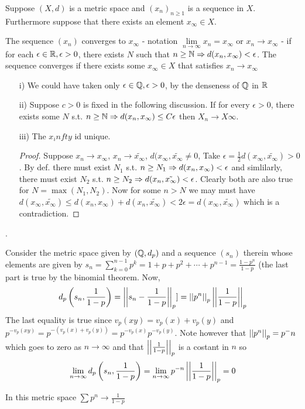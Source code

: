 Suppose $(X,d)$ is a metric space and $(x_n)_{n\geq 1}$ is a sequence in $X$. Furthermore suppose that there exists an element $x_\infty\in X$.
\begin{mydef}
The sequence $(x_n)$ converges to $x_\infty$ - notation $\lim\limits_{n\to\infty} x_n = x_\infty$ or $x_n\to x_\infty$ - if for each $\epsilon\in\mathbb{R},\epsilon>0$, there exists $N$ such that $n\geq\mathbb{N}\Rightarrow d(x_n,x_\infty)<\epsilon$. The sequence converges if there exists some $x_\infty\in X$ that satisfies $x_n\to x_\infty$
\end{mydef}
\begin{rem}
\begin{itemize}
\item[i)] We could have taken only $\epsilon\in\mathbb{Q},\epsilon>0$, by the denseness of $\mathbb{Q}$ in $\mathbb{R}$
\item[ii)] Suppose $c>0$ is fixed in the following discussion. If for every $\epsilon>0$, there exists some $N$ s.t. $n\geq\mathbb{N}\Rightarrow d(x_n,x_\infty)\leq C\epsilon$ then $X_n\to X\infty$.
\item[iii)] The $x_infty$ id unique.
\begin{proof}
Suppose $x_n\to x_\infty$, $x_n\to \tilde{x_\infty}$, $d(x_\infty,\tilde{x_\infty}\neq0$, Take $\epsilon=\frac{1}{2}d(x_\infty,\tilde{x_\infty})>0$. By def. there must exist $N_1$ s.t. $n\geq N_1\Rightarrow d(x_n,x_\infty)<\epsilon$ and simlilarly, there must exist $N_2$ s.t. $n\geq N_2\Rightarrow d(x_n,\tilde{x_\infty})<\epsilon$. Clearly both are also true for $N=\max(N_1,N_2)$. Now for some $n>N$ we may must have $d(x_\infty,\tilde{x_\infty})\leq d(x_n,x_\infty) + d(x_n,\tilde{x_\infty}) < 2\epsilon=d(x_\infty,\tilde{x_\infty})$ which is a contradiction.
\end{proof}
\end{itemize}
\end{rem}.
\begin{example}
Consider the metric space given by $(\mathbb{Q},d_p)$ and a sequence $(s_n)$ therein whose elements are given by $s_n=\sum\limits_{k=0}^{n-1} p^k=1+p+p^2+\cdots+p^{n-1}=\frac{1-p^n}{1-p}$ (the last part is true by the binomial theorem. Now,
\[ d_p\left(s_n,\dfrac{1}{1-p}\right)=\left|\left| s_n-\dfrac{1}{1-p} \right|\right|_p]=\left|\left| p^n \right|\right|_p\left|\left| \dfrac{1}{1-p} \right|\right|_p \]
The last equality is true since $v_p(xy) = v_p(x)+v_p(y)$ and $p^{-v_p(xy)}=p^{-(v_p(x)+v_p(y))}=p^{-v_p(x)}p^{-v_p(y)}$.
Note however that $\left|\left| p^n \right|\right|_p=p^-n$ which goes to zero as $n\to\infty$ and that $\left|\left| \frac{1}{1-p} \right|\right|_p$ is a costant in $n$ so
\[ \lim\limits_{n\to\infty} d_p\left(s_n,\dfrac{1}{1-p}\right) = \lim\limits_{n\to\infty} p^{-n}\left|\left| \dfrac{1}{1-p} \right|\right|_p = 0 \]
\end{example}
 In this metric space $\sum p^n\to\frac{1}{1-p}$
